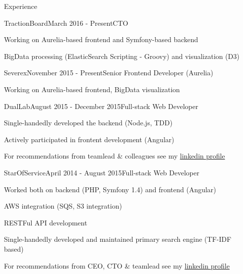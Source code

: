 \documentclass{resume} %
\begin{document}

\begin{rSection}{Experience}


\begin{rSubsection}{TractionBoard}{March 2016 - Present}{CTO}{}
\item Working on Aurelia-based frontend and Symfony-based backend
\item BigData processing (ElasticSearch Scripting - Groovy) and visualization (D3)

\begin{rSubsection}{Severex}{November 2015 - Present}{Senior Frontend Developer (Aurelia)}{}
\item Working on Aurelia-based frontend, BigData visualization
\end{rSubsection}


\begin{rSubsection}{DualLab}{August 2015 - December 2015}{Full-stack Web Developer}{}
\item Single-handedly developed the backend (Node.js, TDD)
\item Actively participated in frontent development (Angular)
\item For recommendations from teamlead \& colleagues see my \href{http://linkedin.com/in/mikhalchenkoa}{linkedin profile}

%

\end{rSubsection}


\begin{rSubsection}{StarOfService}{April 2014 - August 2015}{Full-stack Web Developer}{}
\item Worked both on backend (PHP, Symfony 1.4) and frontend (Angular)
\item AWS integration (SQS, S3 integration)
\item RESTFul API development
\item Single-handedly developed and maintained primary search engine (TF-IDF based)
\item For recommendations from CEO, CTO \& teamlead see my \href{http://linkedin.com/in/mikhalchenkoa}{linkedin profile}


\end{rSubsection}
\end{rSubsection}
\end{rSection}
\end{document}
